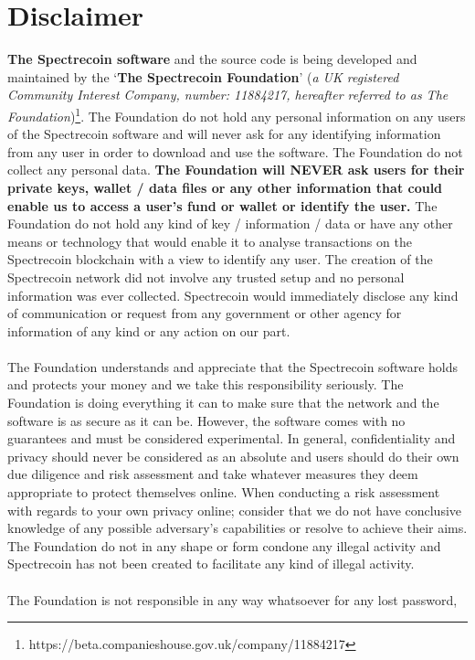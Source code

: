 \section{Disclaimer}
\textbf{The Spectrecoin software} and the source code is being developed and maintained by the ‘\textbf{The Spectrecoin Foundation}’
(\textit{a UK registered Community Interest Company, number: 11884217, hereafter
referred to as The Foundation})\footnote{https://beta.companieshouse.gov.uk/company/11884217}.
The Foundation do not hold any personal information on any users of the
Spectrecoin software and will never ask for any identifying information
from any user in order to download and use the software. The Foundation
do not collect any personal data. \textbf{The Foundation will NEVER ask
users for their private keys, wallet / data files or any other information that could enable us to access a user’s fund or wallet or identify the
user.} The Foundation do not hold any kind of key / information / data
or have any other means or technology that would enable it to analyse
transactions on the Spectrecoin blockchain with a view to identify any
user. The creation of the Spectrecoin network did not involve any trusted
setup and no personal information was ever collected. Spectrecoin would
immediately disclose any kind of communication or request from any
government or other agency for information of any kind or any action on
our part.
\\
\\
The Foundation understands and appreciate that the Spectrecoin software holds and protects your money and we take this responsibility seriously. The
Foundation is doing everything it can to make sure that the network and
the software is as secure as it can be. However, the software comes with
no guarantees and must be considered experimental. In general, confidentiality
and privacy should never be considered as an absolute and users should do their
own due diligence and risk assessment and take whatever measures they deem
appropriate to protect themselves online. When conducting a risk assessment
with regards to your own privacy online; consider that we do not have
conclusive knowledge of any possible adversary’s capabilities or resolve to
achieve their aims. The Foundation do not in any shape or form condone any
illegal activity and Spectrecoin has not been created to facilitate any kind
of illegal activity.
\\
\\
The Foundation is not responsible in any way whatsoever for any lost password,
